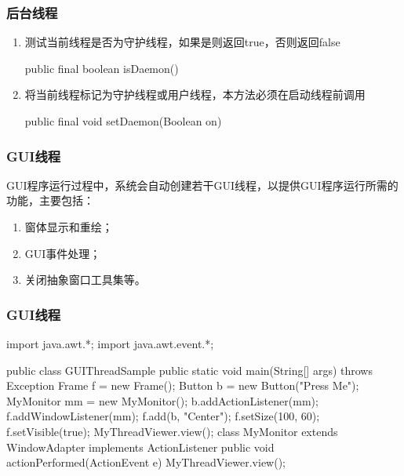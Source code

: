 \begin{frame}[fragile] %
  \frametitle{后台线程}


  \begin{enumerate}\kai
  \item 测试当前线程是否为守护线程，如果是则返回true，否则返回false
    \begin{javaCode}
      public final boolean isDaemon()
    \end{javaCode}
  \item 将当前线程标记为守护线程或用户线程，本方法必须在启动线程前调用
    \begin{javaCode}
      public final void setDaemon(Boolean on)
    \end{javaCode}
  \end{enumerate}

\end{frame}

\begin{frame}[fragile] %
  \frametitle{GUI线程}

  GUI程序运行过程中，系统会自动创建若干GUI线程，以提供GUI程序运行所需的功能，主要包括：

  \begin{enumerate}\kai
  \item 窗体显示和重绘；
  \item GUI事件处理；
  \item 关闭抽象窗口工具集等。
  \end{enumerate}
\end{frame}

\begin{frame}[fragile] %
\frametitle{GUI线程}

\begin{javaCode}
import java.awt.*;
import java.awt.event.*;

public class GUIThreadSample {
  public static void main(String[] args) throws Exception {
    Frame f = new Frame();
    Button b = new Button("Press Me");
    MyMonitor mm = new MyMonitor();
    b.addActionListener(mm);
    f.addWindowListener(mm);
    f.add(b, "Center");
    f.setSize(100, 60);
    f.setVisible(true);
    MyThreadViewer.view();
  }
}
class MyMonitor extends WindowAdapter implements ActionListener {
  public void actionPerformed(ActionEvent e) {
    MyThreadViewer.view();
  }
}
\end{javaCode}
\end{frame}

